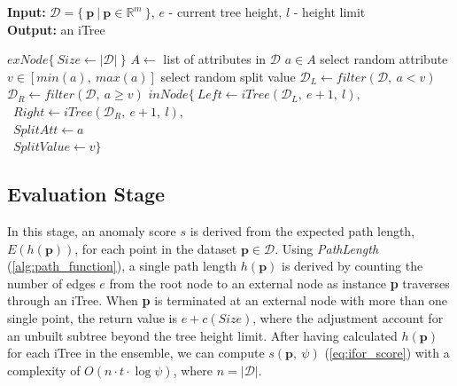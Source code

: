 \begin{algorithm}[h!]
    \caption{$iTree(\mathcal{D},\ e,\ l)$}
    \label{alg:iTree}
    \textbf{Input:} $\mathcal{D} = \{\ \textbf{p}\ |\ \textbf{p} \in \mathbb{R}^m\ \}$, $e$ - current tree height, $l$ - height limit \\
    \textbf{Output:} an iTree
    \begin{algorithmic}[1]
    \State \Return $exNode\{\ Size \gets |\mathcal{D}|\ \}$
    \Else
        \State $A \gets $ list of attributes in $\mathcal{D}$
        \State $a \in A$ select random attribute
        \State $v \in [min(a),\ max(a)]$ select random split value
        \State $\mathcal{D}_L \gets filter(\mathcal{D},\ a < v)$
        \State $\mathcal{D}_R \gets filter(\mathcal{D},\ a \geq v)$
        \State \Return $inNode\{\ Left \gets iTree(\mathcal{D}_L,\ e+1,\ l),$ \\
            \quad \quad \quad \quad \quad \quad \quad \quad \quad\ $Right \gets iTree(\mathcal{D}_R,\ e+1,\ l),$ \\
            \quad \quad \quad \quad \quad \quad \quad \quad \quad\ $SplitAtt \gets a$ \\
            \quad \quad \quad \quad \quad \quad \quad \quad \quad\ $SplitValue \gets v \}$
    \EndIf
    \end{algorithmic}
\end{algorithm}

\subsection{Evaluation Stage}
In this stage, an anomaly score $s$ is derived from the expected path length, $E(h(\textbf{p}))$, for each point in the dataset $\textbf{p} \in \mathcal{D}$. Using \textit{PathLength} (\ref{alg:path_function}), a single path length $h(\textbf{p})$ is derived by counting the number of edges $e$ from the root node to an external node as instance \textbf{p} traverses through an iTree. When \textbf{p} is terminated at an external node with more than one single point, the return value is $e + c(Size)$, where the adjustment account for an unbuilt subtree beyond the tree height limit. \newline
After having calculated $h(\textbf{p})$ for each iTree in the ensemble, we can compute $s(\textbf{p},\ \psi)$ (\ref{eq:ifor_score}) with a complexity of $O(n \cdot t \cdot \log \psi)$, where $n = |\mathcal{D}|$.

